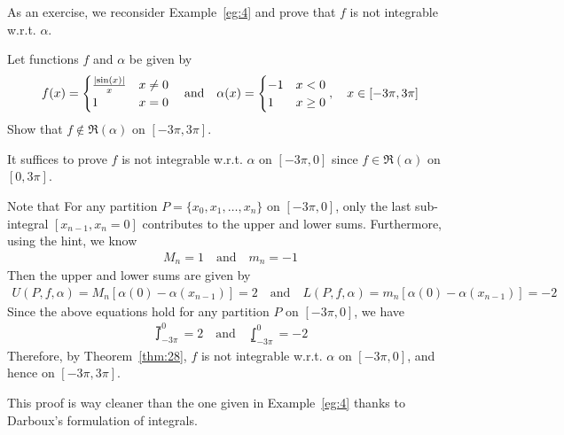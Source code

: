 \documentclass[thmcnt=section, 12pt]{my-elegantbook}
\begin{document}
As an exercise, we reconsider Example~\ref{eg:4} and prove that $f$ is not integrable w.r.t. $\alpha$.

\begin{exercise}
    Let functions $f$ and $\alpha$ be given by
    \begin{align*}
        f(x) = \begin{cases}
                   \frac{\left\lvert \sin(x) \right\rvert}{x} & x \neq 0 \\
                   1                       & x = 0
               \end{cases}
        \quad\text{and}\quad
        \alpha(x) = \begin{cases}
                        -1 & x < 0    \\
                        1  & x \geq 0
                    \end{cases},
        \quad x \in [-3\pi, 3\pi]
    \end{align*}
    Show that $f \notin \mathfrak{R}(\alpha)$ on $[-3\pi, 3\pi]$.

\end{exercise}

\begin{solution}
    It suffices to prove $f$ is not integrable w.r.t. $\alpha$ on $[-3\pi, 0]$ since $f \in \mathfrak{R}(\alpha)$ on $[0, 3\pi]$.

    Note that For any partition $P = \{x_0, x_1, \ldots, x_n\}$ on $[-3\pi, 0]$, only the last sub-integral $[x_{n-1}, x_n = 0]$ contributes to the upper and lower sums. Furthermore, using the hint, we know
    \begin{align*}
        M_n = 1
        \quad \text{and} \quad
        m_n = -1
    \end{align*}
    Then the upper and lower sums are given by
    \begin{align*}
        U(P,f,\alpha) = M_n [\alpha(0) - \alpha(x_{n-1})] = 2
        \quad\text{and}\quad
        L(P,f,\alpha) = m_n [\alpha(0) - \alpha(x_{n-1})] = -2
    \end{align*}
    Since the above equations hold for any partition $P$ on $[-3\pi, 0]$, we have
    \begin{align*}
        \upint_{-3\pi}^0 = 2
        \quad\text{and}\quad
        \lowint_{-3\pi}^0 = -2
    \end{align*}
    Therefore, by Theorem~\ref{thm:28}, $f$ is not integrable w.r.t. $\alpha$ on $[-3\pi, 0]$, and hence on $[-3\pi, 3\pi]$.

    This proof is way cleaner than the one given in Example~\ref{eg:4} thanks to Darboux's formulation of integrals.
\end{solution}
\end{document}
